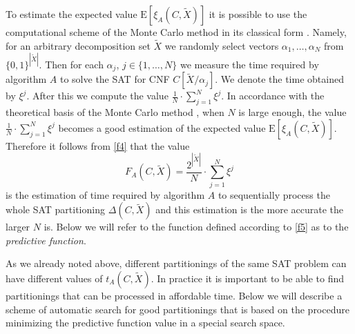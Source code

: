\documentclass[runningheads,a4paper]{llncs}
\begin{document}
To estimate the expected value $\mathrm{E}\left[\xi_A\left(C,\tilde{X}\right)\right]$ it is possible to use the computational scheme of the Monte Carlo method in its classical form \cite{Metropolis49}. Namely, for an arbitrary decomposition set $\tilde{X}$ we randomly select vectors $\alpha_1,\ldots,\alpha_N$ from $\{0,1\}^{|\tilde{X}|}$. Then for each $\alpha_j$, $j\in\{1,\ldots,N\}$ we measure the time required by algorithm $A$ to solve the SAT for CNF $C\left[\tilde{X}/\alpha_j\right]$. We denote the time obtained by $\xi^j$. After this we compute the value $\frac{1}{N}\cdot\sum\limits_{j=1}^{N}\xi^j$. In accordance with the theoretical basis of the Monte Carlo method \cite{Metropolis49,Kalos:109491}, when $N$ is large enough, the value $\frac{1}{N}\cdot\sum\limits_{j=1}^{N}\xi^j$ becomes a good estimation of the expected value $\mathrm{E}\left[\xi_A\left(C,\tilde{X}\right)\right]$. Therefore it follows from \eqref{f4} that the value
\begin{equation}
\label{f5}
F_A\left(C,\tilde{X}\right)=\frac{2^{|\tilde{X}|}}{N}\cdot\sum\limits_{j=1}^{N}\xi^j
\end{equation}
is the estimation of time required by algorithm $A$ to sequentially process the whole SAT partitioning $\Delta\left(C,\tilde{X}\right)$ and this estimation is the more accurate the larger $N$ is. Below we will refer to the function defined according to \eqref{f5} as to the \textit{predictive function}.

As we already noted above, different partitionings of the same SAT problem can have different values of $t_A\left(C,\tilde{X}\right)$. In practice it is important to be able to find partitionings that can be processed in affordable time. Below we will describe a scheme of automatic search for good partitionings that is based on the procedure minimizing the predictive function value in a special search space.
\end{document}
